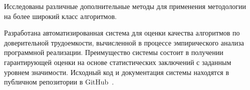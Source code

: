 \documentclass[a4paper, article, 14pt]{extarticle}
\begin{document}
\label{sec:summary}

Исследованы различные дополнительные методы для применения методологии~\cite{petrushyn_ulyanov_analysis} на более широкий класс алгоритмов.

Разработана автоматизированная система для оценки качества алгоритмов по доверительной трудоемкости, вычисленной в процессе эмпирического анализа программной реализации. Преимущество системы состоит в получении гарантирующей оценки на основе статистических заключений с заданным уровнем значимости. Исходный код и документация системы находятся в публичном репозитории в GitHub~\cite{system_source}.

\newpage

\end{document}

